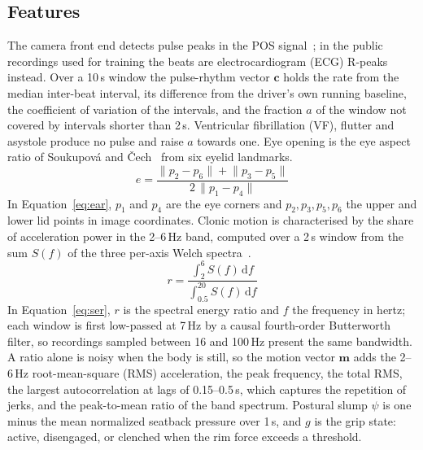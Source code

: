\documentclass[conference]{IEEEtran}
\begin{document}
\subsection{Features}
The camera front end detects pulse peaks in the POS signal~\cite{wang2017pos}; in the public recordings used for training the beats are electrocardiogram (ECG) R-peaks instead. Over a 10\,s window the pulse-rhythm vector $\mathbf{c}$ holds the rate from the median inter-beat interval, its difference from the driver's own running baseline, the coefficient of variation of the intervals, and the fraction $a$ of the window not covered by intervals shorter than 2\,s. Ventricular fibrillation (VF), flutter and asystole produce no pulse and raise $a$ towards one. Eye opening is the eye aspect ratio of Soukupov\'a and \v{C}ech~\cite{soukupova2016} from six eyelid landmarks.
\begin{equation}
e=\frac{\lVert p_2-p_6\rVert+\lVert p_3-p_5\rVert}{2\,\lVert p_1-p_4\rVert}
\label{eq:ear}
\end{equation}
In Equation~\eqref{eq:ear}, $p_1$ and $p_4$ are the eye corners and $p_2,p_3,p_5,p_6$ the upper and lower lid points in image coordinates. Clonic motion is characterised by the share of acceleration power in the 2--6\,Hz band, computed over a 2\,s window from the sum $S(f)$ of the three per-axis Welch spectra~\cite{welch1967}.
\begin{equation}
r=\frac{\int_{2}^{6}S(f)\,\mathrm{d}f}{\int_{0.5}^{20}S(f)\,\mathrm{d}f}
\label{eq:ser}
\end{equation}
In Equation~\eqref{eq:ser}, $r$ is the spectral energy ratio and $f$ the frequency in hertz; each window is first low-passed at 7\,Hz by a causal fourth-order Butterworth filter, so recordings sampled between 16 and 100\,Hz present the same bandwidth. A ratio alone is noisy when the body is still, so the motion vector $\mathbf{m}$ adds the 2--6\,Hz root-mean-square (RMS) acceleration, the peak frequency, the total RMS, the largest autocorrelation at lags of 0.15--0.5\,s, which captures the repetition of jerks, and the peak-to-mean ratio of the band spectrum. Postural slump $\psi$ is one minus the mean normalized seatback pressure over 1\,s, and $g$ is the grip state: active, disengaged, or clenched when the rim force exceeds a threshold.
\end{document}
